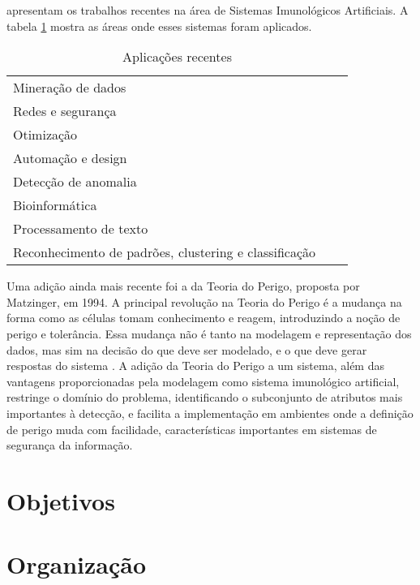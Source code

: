 \citet{Dasgupta2010} apresentam os trabalhos recentes na área de Sistemas Imunológicos Artificiais. A tabela \ref{ais:applications} mostra as áreas onde esses sistemas foram aplicados.

\vspace{2mm}
\begin{table}[h!]
    \centering
    \caption{Aplicações recentes \cite{Dasgupta2010}}
    \begin{tabular}{l c r}
        \\
        \hline
        Mineração de dados                                    \\
        Redes e segurança                                     \\
        Otimização                                            \\
        Automação e design                                    \\
        Detecção de anomalia                                  \\
        Bioinformática                                        \\
        Processamento de texto                                \\
        Reconhecimento de padrões, clustering e classificação \\
        \hline
    \end{tabular}
    \label{ais:applications}
\end{table}
\vspace{2mm}

Uma adição ainda mais recente foi a da Teoria do Perigo, proposta por Matzinger, em 1994. A principal revolução na Teoria do Perigo é a mudança na forma como as células tomam conhecimento e reagem, introduzindo a noção de perigo e tolerância. Essa mudança não é tanto na modelagem e representação dos dados, mas sim na decisão do que deve ser modelado, e o que deve gerar respostas do sistema \cite{Aickelin2005}. A adição da Teoria do Perigo a um sistema, além das vantagens proporcionadas pela modelagem como sistema imunológico artificial, restringe o domínio do problema, identificando o subconjunto de atributos mais importantes à detecção, e facilita a implementação em ambientes onde a definição de perigo muda com facilidade, características importantes em sistemas de segurança da informação.

\section{Objetivos}
\section{Organização}

